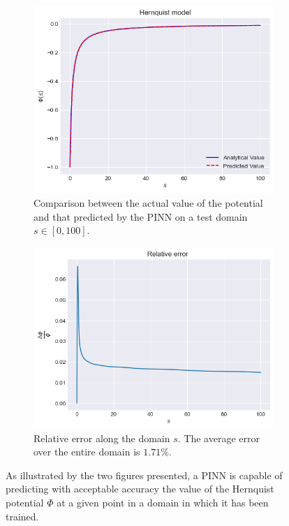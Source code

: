 \begin{figure}
    \centering
        \begin{subfigure}[b]{0.49\textwidth}
        \centering
        \includegraphics[width=\textwidth]{imgs/test-plot-hernquist.png}
        \caption{Comparison between the actual value of the potential and that predicted by the PINN on a test domain $s \in [0, 100]$.}
        \label{fig:test-plot-hernquist}
        \end{subfigure}
    \hfill
    \begin{subfigure}[b]{0.49\textwidth}
        \centering
        \includegraphics[width=\textwidth]{imgs/relative-error-hernquist.png}
        \caption{Relative error along the domain $s$. The average error over the entire domain is $1.71$\%.}
        \label{fig:relative-error-hernquist}
    \end{subfigure}
    \caption{As illustrated by the two figures presented, a PINN is capable of predicting with acceptable accuracy the value of the Hernquist potential $\Phi$ at a given point in a domain in which it has been trained.}
    \label{fig:three graphs}
\end{figure}

